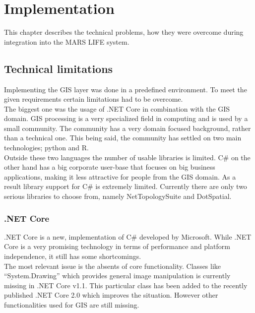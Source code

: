 
% 
\chapter{Implementation}
\label{sec:implementation}
This chapter describes the technical problems, how they were overcome during integration into the MARS LIFE system.



\section{Technical limitations}
Implementing the GIS layer was done in a predefined environment. To meet the given requirements certain limitations had to be overcome.\\
The biggest one was the usage of .NET Core in combination with the GIS domain. GIS processing is a very specialized field in computing and is used by a small community. The community has a very domain focused background, rather than a technical one. This being said, the community has settled on two main technologies; python and R.\\
Outside these two languages the number of usable libraries is limited. C\# on the other hand has a big corporate user-base that focuses on big business applications, making it less attractive for people from the GIS domain. As a result library support for C\# is extremely limited. Currently there are only two serious libraries to choose from, namely NetTopologySuite and DotSpatial.\\


\subsection{.NET Core}
.NET Core is a new, implementation of C\# developed by Microsoft. While .NET Core is a very promising technology in terms of performance and platform independence, it still has some shortcomings.\\
The most relevant issue is the absents of core functionality. Classes like \enquote{System.Drawing} which provides general image manipulation is currently missing in .NET Core v1.1. This particular class has been added to the recently published .NET Core 2.0 which improves the situation. However other functionalities used for GIS are still missing.


